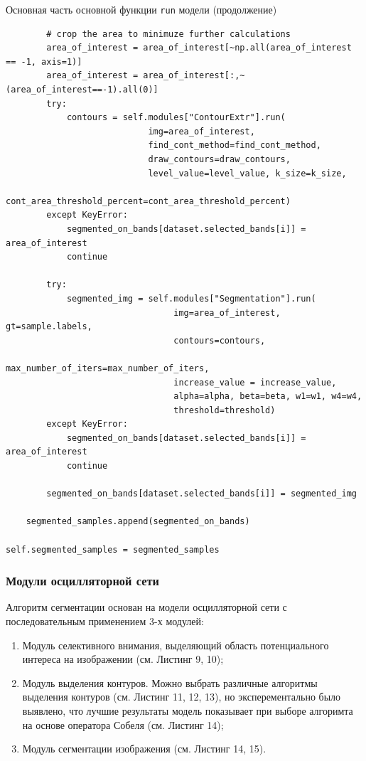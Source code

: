 \documentclass[14pt, russian]{scrartcl}
\begin{document}
\begin{listing}[!htt]
    \caption{Основная часть основной функции \texttt{run} модели (продолжение)}
    \label{lst:model_run}
    \begin{verbatim}
        # crop the area to minimuze further calculations
        area_of_interest = area_of_interest[~np.all(area_of_interest == -1, axis=1)]
        area_of_interest = area_of_interest[:,~(area_of_interest==-1).all(0)]
        try:
            contours = self.modules["ContourExtr"].run(
                            img=area_of_interest, 
                            find_cont_method=find_cont_method, 
                            draw_contours=draw_contours,
                            level_value=level_value, k_size=k_size,
                            cont_area_threshold_percent=cont_area_threshold_percent)
        except KeyError:
            segmented_on_bands[dataset.selected_bands[i]] = area_of_interest
            continue

        try:
            segmented_img = self.modules["Segmentation"].run(
                                 img=area_of_interest, gt=sample.labels,
                                 contours=contours,
                                 max_number_of_iters=max_number_of_iters,
                                 increase_value = increase_value,
                                 alpha=alpha, beta=beta, w1=w1, w4=w4,
                                 threshold=threshold)
        except KeyError:
            segmented_on_bands[dataset.selected_bands[i]] = area_of_interest
            continue

        segmented_on_bands[dataset.selected_bands[i]] = segmented_img

    segmented_samples.append(segmented_on_bands)

self.segmented_samples = segmented_samples
    \end{verbatim}
\end{listing}
\subsubsection{Модули осцилляторной сети}\label{subsect::onn_modules}

Алгоритм сегментации основан на модели осцилляторной сети с последовательным применением 3-х модулей:
\begin{enumerate}
    \item Модуль селективного внимания, выделяющий область потенциального интереса на изображении (см. Листинг 9, 10);
    \item Модуль выделения контуров. Можно выбрать различные алгоритмы выделения контуров (см. Листинг 11, 12, 13), но эксперементально было выявлено, что лучшие результаты модель показывает при выборе алгоримта на основе оператора Собеля (см. Листинг 14);
    \item Модуль сегментации изображения (см. Листинг 14, 15).
\end{enumerate}
\end{document}
